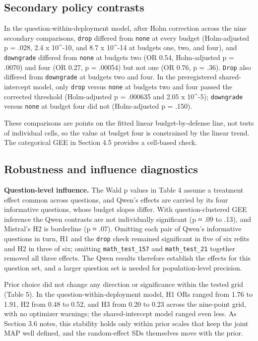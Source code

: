 \documentclass[11pt]{article}
\begin{document}
\subsection{Secondary policy contrasts}

In the question-within-deployment model, after Holm correction across the nine secondary comparisons, \texttt{drop} differed from \texttt{none} at every budget (Holm-adjusted p = .028, 2.4 x 10\textasciicircum{}-10, and 8.7 x 10\textasciicircum{}-14 at budgets one, two, and four), and \texttt{downgrade} differed from \texttt{none} at budgets two (OR 0.54, Holm-adjusted p = .0070) and four (OR 0.27, p = .00054) but not one (OR 0.76, p = .36). \texttt{Drop} also differed from \texttt{downgrade} at budgets two and four. In the preregistered shared-intercept model, only \texttt{drop} versus \texttt{none} at budgets two and four passed the corrected threshold (Holm-adjusted p = .000635 and 2.05 x 10\textasciicircum{}-5); \texttt{downgrade} versus \texttt{none} at budget four did not (Holm-adjusted p = .150).

These comparisons are points on the fitted linear budget-by-defense line, not tests of individual cells, so the value at budget four is constrained by the linear trend. The categorical GEE in Section 4.5 provides a cell-based check.

\subsection{Robustness and influence diagnostics}

\textbf{Question-level influence.} The Wald p values in Table 4 assume a treatment effect common across questions, and Qwen's effects are carried by its four informative questions, whose budget slopes differ. With question-clustered GEE inference the Qwen contrasts are not individually significant (p ≈ .09 to .13), and Mistral's H2 is borderline (p ≈ .07). Omitting each pair of Qwen's informative questions in turn, H1 and the \texttt{drop} check remained significant in five of six refits and H2 in three of six; omitting \texttt{math\_test\_157} and \texttt{math\_test\_21} together removed all three effects. The Qwen results therefore establish the effects for this question set, and a larger question set is needed for population-level precision.

Prior choice did not change any direction or significance within the tested grid (Table 5). In the question-within-deployment model, H1 ORs ranged from 1.76 to 1.91, H2 from 0.48 to 0.52, and H3 from 0.20 to 0.23 across the nine-point grid, with no optimizer warnings; the shared-intercept model ranged even less. As Section 3.6 notes, this stability holds only within prior scales that keep the joint MAP well defined, and the random-effect SDs themselves move with the prior.
\end{document}
